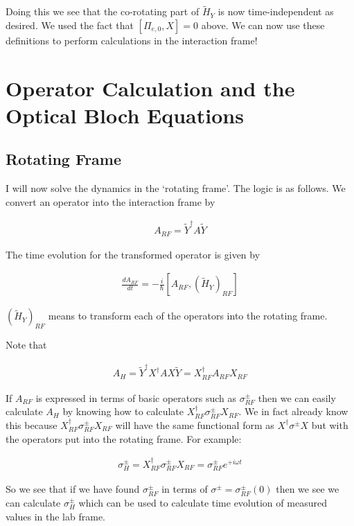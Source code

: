 \documentclass[12pt]{article}
\newcommand{\ddt}[1]{\frac{d #1}{dt}}
\begin{document}
Doing this we see that the co-rotating part of $\tilde{H}_Y$ is now time-independent as desired. We used the fact that $[\Pi_{e,0},X]=0$ above. We can now use these definitions to perform calculations in the interaction frame!

\section{Operator Calculation and the Optical Bloch Equations}

\subsection{Rotating Frame}
I will now solve the dynamics in the `rotating frame'. The logic is as follows. We convert an operator into the interaction frame by

\begin{align}
A_{RF} = \tilde{Y}^{\dag}A\tilde{Y}
\end{align}

The time evolution for the transformed operator is given by

\begin{align}
\ddt{A_{RF}} = -\frac{i}{\hbar}\left[A_{RF},\left(\tilde{H}_Y\right)_{RF}\right]
\end{align}

$\left(\tilde{H}_Y\right)_{RF}$ means to transform each of the operators into the rotating frame.

Note that

\begin{align}
A_H = \tilde{Y}^{\dag}X^{\dag}A X \tilde{Y} = X^{\dag}_{RF}A_{RF}X_{RF}
\end{align}

If $A_{RF}$ is expressed in terms of basic operators such as $\sigma^{\pm}_{RF}$ then we can easily calculate $A_H$ by knowing how to calculate $X^{\dag}_{RF}\sigma^{\pm}_{RF}X_{RF}$. We in fact already know this because $X^{\dag}_{RF}\sigma^{\pm}_{RF}X_{RF}$ will have the same functional form as $X^{\dag}\sigma^{\pm}X$ but with the operators put into the rotating frame. For example:

\begin{align}
\sigma^{\pm}_H = X^{\dag}_{RF}\sigma^{\pm}_{RF}X_{RF} = \sigma_{RF}^{\pm}e^{+i\omega t}
\end{align}

So we see that if we have found $\sigma^{\pm}_{RF}$ in terms of $\sigma^{\pm} = \sigma^{\pm}_{RF}(0)$ then we see we can calculate $\sigma^{\pm}_H$ which can be used to calculate time evolution of measured values in the lab frame.
\end{document}
